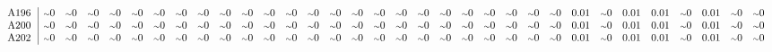 \begin{table}[H]
\begin{center}
\begin{math}
\begin{array}{c|cccccccccccccccccccccccccccccccc}
\mathrm{A196} \hspace*{2pt} &  {\scriptstyle \sim }0 &  {\scriptstyle \sim }0 &  {\scriptstyle \sim }0 &  {\scriptstyle \sim }0 &  {\scriptstyle \sim }0 &  {\scriptstyle \sim }0 &  {\scriptstyle \sim }0 &  {\scriptstyle \sim }0 &  {\scriptstyle \sim }0 &  {\scriptstyle \sim }0 &  {\scriptstyle \sim }0 &  {\scriptstyle \sim }0 &  {\scriptstyle \sim }0 &  {\scriptstyle \sim }0 &  {\scriptstyle \sim }0 &  {\scriptstyle \sim }0 &  {\scriptstyle \sim }0 &  {\scriptstyle \sim }0 &  {\scriptstyle \sim }0 &  {\scriptstyle \sim }0 &  {\scriptstyle \sim }0 &  {\scriptstyle \sim }0 &  {\scriptstyle \sim }0 &  {\scriptstyle \sim }0 &       0.01 &  {\scriptstyle \sim }0 &       0.01 &       0.01 &  {\scriptstyle \sim }0 &       0.01 &  {\scriptstyle \sim }0 &  {\scriptstyle \sim }0 \\
\mathrm{A200} \hspace*{2pt} &  {\scriptstyle \sim }0 &  {\scriptstyle \sim }0 &  {\scriptstyle \sim }0 &  {\scriptstyle \sim }0 &  {\scriptstyle \sim }0 &  {\scriptstyle \sim }0 &  {\scriptstyle \sim }0 &  {\scriptstyle \sim }0 &  {\scriptstyle \sim }0 &  {\scriptstyle \sim }0 &  {\scriptstyle \sim }0 &  {\scriptstyle \sim }0 &  {\scriptstyle \sim }0 &  {\scriptstyle \sim }0 &  {\scriptstyle \sim }0 &  {\scriptstyle \sim }0 &  {\scriptstyle \sim }0 &  {\scriptstyle \sim }0 &  {\scriptstyle \sim }0 &  {\scriptstyle \sim }0 &  {\scriptstyle \sim }0 &  {\scriptstyle \sim }0 &  {\scriptstyle \sim }0 &  {\scriptstyle \sim }0 &       0.01 &  {\scriptstyle \sim }0 &       0.01 &       0.01 &  {\scriptstyle \sim }0 &       0.01 &  {\scriptstyle \sim }0 &  {\scriptstyle \sim }0 \\
\mathrm{A202} \hspace*{2pt} &  {\scriptstyle \sim }0 &  {\scriptstyle \sim }0 &  {\scriptstyle \sim }0 &  {\scriptstyle \sim }0 &  {\scriptstyle \sim }0 &  {\scriptstyle \sim }0 &  {\scriptstyle \sim }0 &  {\scriptstyle \sim }0 &  {\scriptstyle \sim }0 &  {\scriptstyle \sim }0 &  {\scriptstyle \sim }0 &  {\scriptstyle \sim }0 &  {\scriptstyle \sim }0 &  {\scriptstyle \sim }0 &  {\scriptstyle \sim }0 &  {\scriptstyle \sim }0 &  {\scriptstyle \sim }0 &  {\scriptstyle \sim }0 &  {\scriptstyle \sim }0 &  {\scriptstyle \sim }0 &  {\scriptstyle \sim }0 &  {\scriptstyle \sim }0 &  {\scriptstyle \sim }0 &  {\scriptstyle \sim }0 &       0.01 &  {\scriptstyle \sim }0 &       0.01 &       0.01 &  {\scriptstyle \sim }0 &       0.01 &  {\scriptstyle \sim }0 &  {\scriptstyle \sim }0 \\

\end{array}
\end{math}
\end{center}
\end{table}
